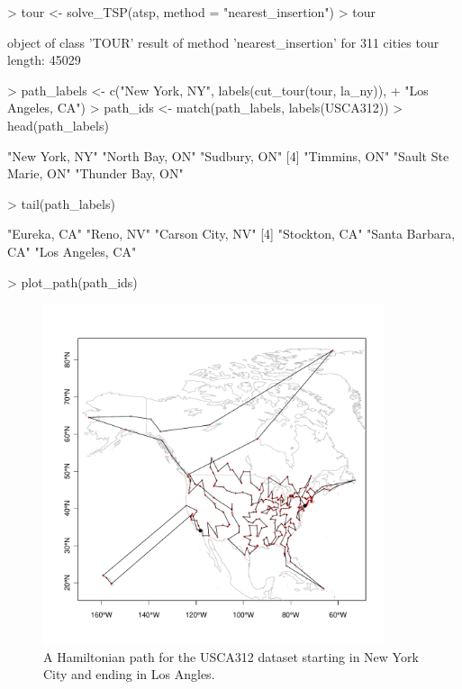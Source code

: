 \documentclass[10pt,a4paper,fleqn]{article}
\begin{document}
\begin{Schunk}
\begin{Sinput}
> tour <- solve_TSP(atsp, method = "nearest_insertion")
> tour
\end{Sinput}
\begin{Soutput}
object of class 'TOUR' 
result of method 'nearest_insertion' for 311 cities
tour length: 45029 
\end{Soutput}
\begin{Sinput}
> path_labels <- c("New York, NY", labels(cut_tour(tour, la_ny)), 
+     "Los Angeles, CA")
> path_ids <- match(path_labels, labels(USCA312))
> head(path_labels)
\end{Sinput}
\begin{Soutput}
[1] "New York, NY"        "North Bay, ON"       "Sudbury, ON"        
[4] "Timmins, ON"         "Sault Ste Marie, ON" "Thunder Bay, ON"    
\end{Soutput}
\begin{Sinput}
> tail(path_labels)
\end{Sinput}
\begin{Soutput}
[1] "Eureka, CA"        "Reno, NV"          "Carson City, NV"  
[4] "Stockton, CA"      "Santa Barbara, CA" "Los Angeles, CA"  
\end{Soutput}
\end{Schunk}
\begin{Schunk}
\begin{Sinput}
> plot_path(path_ids)
\end{Sinput}
\end{Schunk}

\begin{figure}
\centering
\includegraphics[width=10cm, trim=0 30 0 0]{TSP-map3}
\caption{A Hamiltonian path for the USCA312 dataset starting in New York City
and ending in Los Angles.}
\label{fig:map3}
\end{figure}
\end{document}
